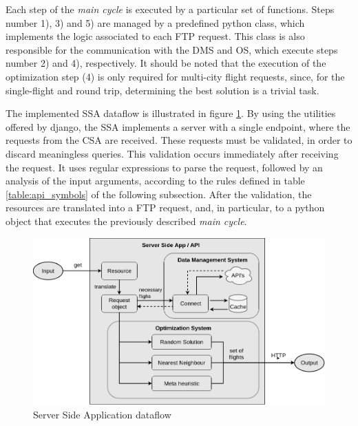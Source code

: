 Each step of the \textit{main cycle} is executed by a particular set of functions. Steps number 1), 3) and 5) are managed by a predefined python class, which implements the logic associated to each FTP request. This class is also responsible for the communication with the DMS and OS, which execute steps number 2) and 4), respectively. It should be noted that the execution of the optimization step (4) is only required for multi-city flight requests, since, for the single-flight and round trip, determining the best solution is a trivial task.



The implemented SSA dataflow is illustrated in figure \ref{fig:api_structure}. By using the utilities offered by django, the SSA implements a server with a single endpoint, where the requests from the CSA are received. These requests must be validated, in order to discard meaningless queries. This validation occurs immediately after receiving the request. It uses regular expressions to parse the request, followed by an analysis of the input arguments, according to the rules defined in table \ref{table:api_symbols} of the following subsection. After the validation, the resources are translated into a FTP request, and, in particular, to a python object that executes the previously described \textit{main cycle}.



\begin{figure}[htpb]
  \centering
  \includegraphics[width=\textwidth]{./Figures/system_implementation/api.png}
  \caption{Server Side Application dataflow}
  \label{fig:api_structure}  
\end{figure}